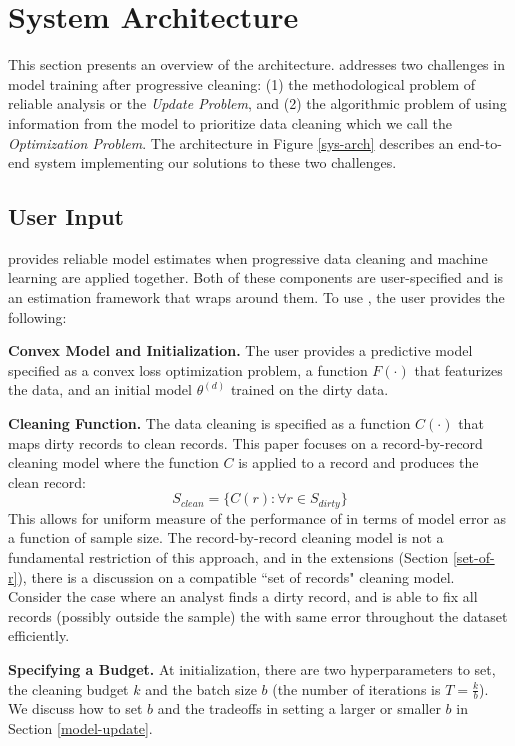\section{System Architecture}\label{arch}
This section presents an overview of the \sys architecture.
\sys addresses two challenges in model training after progressive cleaning: (1) the methodological problem of reliable analysis or the \emph{Update Problem}, and (2) the algorithmic problem of using information from the model to prioritize data cleaning which we call the \emph{Optimization Problem}.
The \sys architecture in Figure \ref{sys-arch} describes an end-to-end system implementing our solutions to these two challenges.

\subsection{User Input}\label{uinp}
\sys provides reliable model estimates when progressive data cleaning and machine learning are applied together.
Both of these components are user-specified and \sys is an estimation framework that wraps around them.
To use \sys, the user provides the following:

\noindent\textbf{Convex Model and Initialization. } The user provides a predictive model specified as a convex loss optimization problem, a function $F(\cdot)$ that featurizes the data, and an initial model $\theta^{(d)}$ trained on the dirty data. 

\vspace{0.25em}

\noindent\textbf{Cleaning Function. } The data cleaning is specified as a function $C(\cdot)$ that maps dirty records to clean records. This paper focuses on a record-by-record cleaning model where the function $C$ is applied to a record and produces the clean record:
\[
S_{clean} = \{C(r) : \forall r \in S_{dirty}\}
\]
This allows for uniform measure of the performance of \sys in terms of model error as a function of sample size. The record-by-record cleaning model is not a fundamental restriction of this approach, and in the extensions (Section \ref{set-of-r}), there is a discussion on a compatible ``set of records" cleaning model. Consider the case where an analyst finds a dirty record, and is able to fix all records (possibly outside the sample) the with same error throughout the dataset efficiently.

\vspace{0.25em}

\noindent\textbf{Specifying a Budget. } At initialization, there are two hyperparameters to set, the cleaning budget $k$ and the batch size $b$ (the number of iterations is $T = \frac{k}{b}$).
We discuss how to set $b$ and the tradeoffs in setting a larger or smaller $b$ in Section \ref{model-update}.

